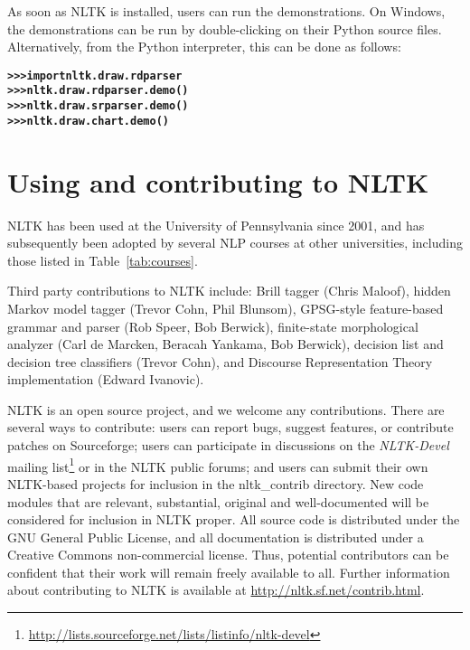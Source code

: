 \documentclass[11pt]{article}
\begin{document}
As soon as NLTK is installed, users can run the demonstrations.  On
Windows, the demonstrations can be run by double-clicking on their
Python source files.  Alternatively, from the Python interpreter, this
can be done as follows:

\begin{alltt} \small
\textbf{>>> import nltk.draw.rdparser}
\textbf{>>> nltk.draw.rdparser.demo()}
\textbf{>>> nltk.draw.srparser.demo()}
\textbf{>>> nltk.draw.chart.demo()}
\end{alltt}

\section{Using and contributing to NLTK}

NLTK has been used at the University of Pennsylvania since 2001, and has
subsequently been adopted by several NLP courses at other
universities, including those listed in Table~\ref{tab:courses}.

Third party contributions to NLTK include: Brill tagger (Chris Maloof),
hidden Markov model tagger (Trevor Cohn, Phil Blunsom), GPSG-style feature-based grammar
and parser (Rob Speer, Bob Berwick), finite-state morphological analyzer
(Carl de Marcken, Beracah Yankama, Bob Berwick), decision list and decision tree
classifiers (Trevor Cohn), and Discourse Representation Theory
implementation (Edward Ivanovic).

NLTK is an open source project, and we welcome any contributions.
There are several ways to contribute: users can report bugs, suggest
features, or contribute patches on Sourceforge; users can participate
in discussions on the \textit{NLTK-Devel} mailing
list\footnote{\url{http://lists.sourceforge.net/lists/listinfo/nltk-devel}}
or in the NLTK public
forums; and users can submit their own NLTK-based projects for
inclusion in the nltk\_contrib directory.  New code modules that are
relevant, substantial, original and well-documented will be considered
for inclusion in NLTK proper.
All source code is distributed under the GNU General Public License,
and all documentation is distributed under a Creative Commons
non-commercial license.  Thus, potential contributors can be confident that their
work will remain freely available to all.  Further information about
contributing to NLTK is available at \url{http://nltk.sf.net/contrib.html}.
\end{document}
